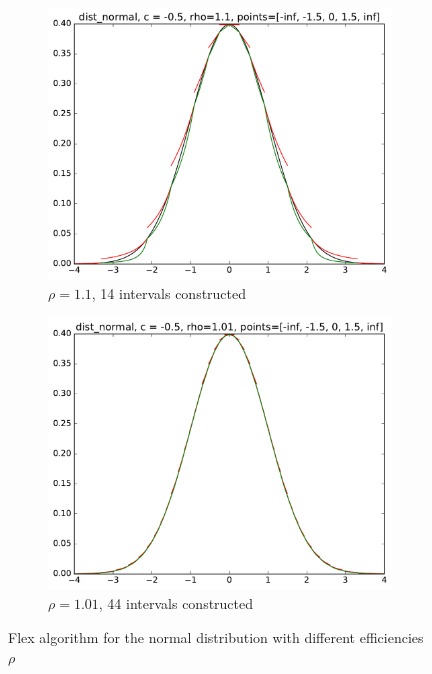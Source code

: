 \begin{figure}[h]
\begin{subfigure}[b]{0.49\textwidth}
        \includegraphics[width=\textwidth]{figs/tf_example_normal_14.pdf}
        \caption{$\rho = 1.1$, 14 intervals constructed}
    \end{subfigure}
    \begin{subfigure}[b]{0.49\textwidth}
        \includegraphics[width=\textwidth]{figs/tf_example_normal_44.pdf}
        \caption{$\rho = 1.01$, 44 intervals constructed}
    \end{subfigure}
    \caption{Flex algorithm for the normal distribution with different efficiencies $\rho$}
     \label{fig:tf_example_normal}
\end{figure}

